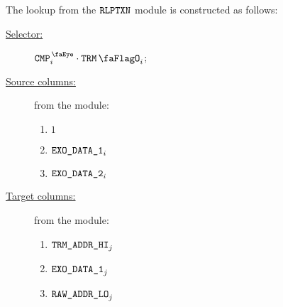The lookup from the $\texttt{RLPTXN}$ module is constructed as follows:
\begin{description}
	\item[\underline{Selector:}] $\isCmp_{i} \cdot \trmFlag_{i}$;
	\item[\underline{Source columns:}] from the \rlpTxnMod{} module:
	\begin{multicols}{3}
	\begin{enumerate}
		\item $1$
		\item $\texttt{EXO\_DATA\_1}_{i}$
		\item $\texttt{EXO\_DATA\_2}_{i}$
		
	\end{enumerate}
	\end{multicols}
\item[\underline{Target columns:}] from the \trmMod{} module: 
	\begin{multicols}{3}
	\begin{enumerate}
		\item $\texttt{TRM}\texttt{\_}\texttt{ADDR}\texttt{\_HI}_{j}$
		\item $\texttt{EXO\_DATA\_1}_{j}$
		\item $\texttt{RAW\_ADDR\_LO}_{j}$
	\end{enumerate} 
	\end{multicols}
\end{description}
